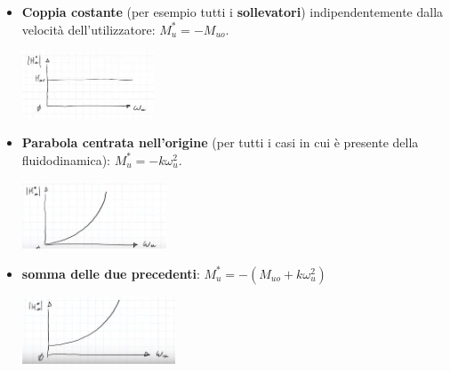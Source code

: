 \begin{itemize}
    \item \textbf{Coppia costante} (per esempio tutti i \textbf{sollevatori}) indipendentemente dalla velocità dell'utilizzatore: $M_u^* = - M_{uo}$.
    \begin{center}
        \includegraphics[height=2cm]{../lezione12/img10.JPG}
    \end{center}
    \item \textbf{Parabola centrata nell'origine} (per tutti i casi in cui è presente della fluidodinamica): $M_u^* = - k \omega_u^2$.
    \begin{center}
        \includegraphics[height=2cm]{../lezione12/img11.JPG}
    \end{center}
    \item \textbf{somma delle due precedenti}: $M_u^* = - (M_{uo} + k \omega_u^2)$
    \begin{center}
        \includegraphics[height=2cm]{../lezione12/img12.JPG}
    \end{center}
\end{itemize}